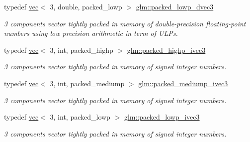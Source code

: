 \begin{DoxyCompactItemize}
\mbox{\label{group__gtc__type__aligned_ga1e9e7d228165ce69595237084e2c1458}} 
typedef \hyperlink{structglm_1_1vec}{vec}$<$ 3, double, packed\+\_\+lowp $>$ \hyperlink{group__gtc__type__aligned_ga1e9e7d228165ce69595237084e2c1458}{glm\+::packed\+\_\+lowp\+\_\+dvec3}
\begin{DoxyCompactList}\small\item\em 3 components vector tightly packed in memory of double-\/precision floating-\/point numbers using low precision arithmetic in term of U\+L\+Ps. \end{DoxyCompactList}\item 
\mbox{\label{group__gtc__type__aligned_ga56b9f0123506edc416bbcf957d3ce678}} 
typedef \hyperlink{structglm_1_1vec}{vec}$<$ 3, int, packed\+\_\+highp $>$ \hyperlink{group__gtc__type__aligned_ga56b9f0123506edc416bbcf957d3ce678}{glm\+::packed\+\_\+highp\+\_\+ivec3}
\begin{DoxyCompactList}\small\item\em 3 components vector tightly packed in memory of signed integer numbers. \end{DoxyCompactList}\item 
\mbox{\label{group__gtc__type__aligned_ga7f737483a80a724f8fde24e8402616f8}} 
typedef \hyperlink{structglm_1_1vec}{vec}$<$ 3, int, packed\+\_\+mediump $>$ \hyperlink{group__gtc__type__aligned_ga7f737483a80a724f8fde24e8402616f8}{glm\+::packed\+\_\+mediump\+\_\+ivec3}
\begin{DoxyCompactList}\small\item\em 3 components vector tightly packed in memory of signed integer numbers. \end{DoxyCompactList}\item 
\mbox{\label{group__gtc__type__aligned_gac0de36c7d01951895c5e227817508a15}} 
typedef \hyperlink{structglm_1_1vec}{vec}$<$ 3, int, packed\+\_\+lowp $>$ \hyperlink{group__gtc__type__aligned_gac0de36c7d01951895c5e227817508a15}{glm\+::packed\+\_\+lowp\+\_\+ivec3}
\begin{DoxyCompactList}\small\item\em 3 components vector tightly packed in memory of signed integer numbers. \end{DoxyCompactList}\item 

\end{DoxyCompactItemize}
